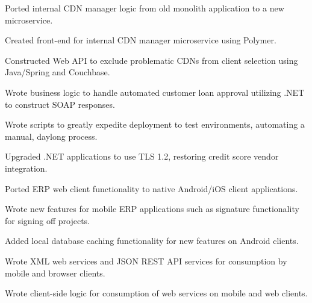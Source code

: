 \documentclass[line]{resume}
\begin{document}
\vspace{2px}

\begin{myitemize}
	\item Ported internal CDN manager logic from old monolith application to a new microservice.
	\item Created front-end for internal CDN manager microservice using Polymer.
	\item Constructed Web API to exclude problematic CDNs from client selection using Java/Spring and Couchbase.
\end{myitemize}

\vspace{2px}

\begin{myitemize}
	\item Wrote business logic to handle automated customer loan approval utilizing .NET to construct SOAP responses.
	\item Wrote scripts to greatly expedite deployment to test environments, automating a manual, daylong process.
	\item Upgraded .NET applications to use TLS 1.2, restoring credit score vendor integration.
\end{myitemize}

\vspace{2px}

\begin{myitemize}
	\item Ported ERP web client functionality to native Android/iOS client applications.
	\item Wrote new features for mobile ERP applications such as signature functionality for signing off projects.
	\item Added local database caching functionality for new features on Android clients.
	\item Wrote XML web services and JSON REST API services for consumption by mobile and browser clients.
	\item Wrote client-side logic for consumption of web services on mobile and web clients.
\end{myitemize}
\end{document}
